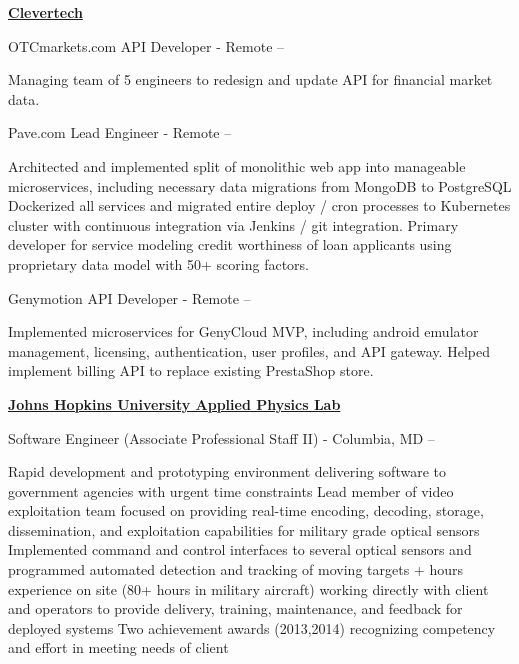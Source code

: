 \documentclass[a4paper,10pt,oneside]{article}
\begin{document}
\begin{minipage}[t][0pt]{\linewidth}
\begin{body}
\href{http://www.clevertech.biz/}
{\textbf{Clevertech}}
\par
OTCmarkets.com API Developer - Remote
\hfill
{} -- 
\begin{detail}
\BulletItem Managing team of 5 engineers to redesign and update API for financial market data. 
\end{detail}

\par
Pave.com Lead Engineer - Remote
\hfill
{} -- 
\begin{detail}
\BulletItem Architected and implemented split of monolithic web app into manageable microservices, including necessary data migrations from MongoDB to PostgreSQL
\BulletItem Dockerized all services and migrated entire deploy / cron processes to Kubernetes cluster with continuous integration via Jenkins / git integration. 
\BulletItem Primary developer for service modeling credit worthiness of loan applicants using proprietary data model with 50+ scoring factors. 
\end{detail} 

\par
Genymotion API Developer - Remote
\hfill
{} -- 
\begin{detail}
\BulletItem Implemented microservices for GenyCloud MVP, including android emulator management, licensing, authentication, user profiles, and API gateway. 
\BulletItem Helped implement billing API to replace existing PrestaShop store. 
\end{detail}

\EntryGap

\href{http://www.jhuapl.edu/}
{\textbf{Johns Hopkins University Applied Physics Lab}}
\par
Software Engineer (Associate Professional Staff II) - Columbia, MD
\hfill
{} --
\begin{detail}

\BulletItem
Rapid development and prototyping environment delivering software to government agencies with urgent time constraints
\BulletItem
Lead member of video exploitation team focused on providing real-time encoding, decoding, storage, dissemination, and exploitation capabilities for military grade optical sensors
\BulletItem
Implemented command and control interfaces to several optical sensors and programmed automated detection and tracking of moving targets
+ hours experience on site (80+ hours in military aircraft) working directly with client and operators to provide delivery, training, maintenance, and feedback for deployed systems
\BulletItem
Two achievement awards (2013,2014) recognizing competency and effort in meeting needs of client
\end{detail}


\end{body}
\end{minipage}
\end{document}
